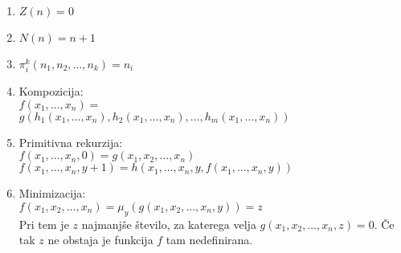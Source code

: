 \documentclass[a4paper]{article}
\begin{document}
\begin{multicols}{2}
\begin{enumerate}
\item $Z(n)=0$
\item $N(n)=n+1$
\item $\pi^k_i (n_1, n_2, \dots, n_k)=n_i$
\item Kompozicija: \\
	$ f(x_1, \dots, x_n) = $ \\ $ g(h_1(x_1, \dots, x_n), h_2(x_1,\dots, x_n), \dots, h_m(x_1, \dots, x_n)) $ 
\item Primitivna rekurzija: \\
	$ f(x_1, \dots, x_n, 0) = g(x_1, x_2, \dots, x_n) $ \\
	$ f(x_1, \dots, x_n, y+1) = h(x_1, \dots, x_n, y, f(x_1, \dots, x_n, y)) $
\item Minimizacija: \\
	$ f(x_1, x_2, \dots, x_n) = \mu_y (g(x_1, x_2, \dots, x_n, y)) = z $ \\
	Pri tem je $z$ najmanjše število, za katerega velja $g(x_1, x_2, \dots, x_n, z) = 0$. Če tak $z$ ne obstaja je funkcija $f$ tam nedefinirana.
\end{enumerate}

\end{multicols}
\end{document}
